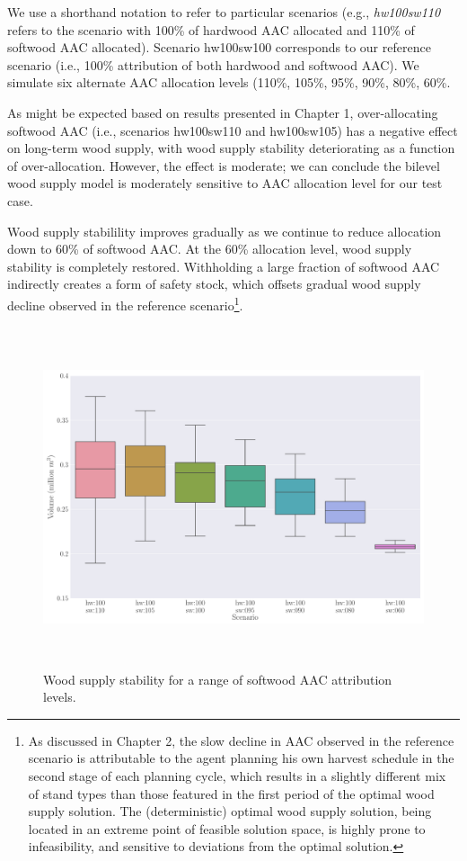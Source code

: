We use a shorthand notation to refer to particular scenarios (e.g., \emph{hw100sw110} refers to the scenario with 100\% of hardwood AAC allocated and 110\% of softwood AAC allocated).
Scenario hw100sw100 corresponds to our reference scenario (i.e., 100\% attribution of both hardwood and softwood AAC). 
We simulate six alternate AAC allocation levels (110\%, 105\%, 95\%, 90\%, 80\%, 60\%. 

As might be expected based on results presented in Chapter 1, over-allocating softwood AAC (i.e., scenarios hw100sw110 and hw100sw105) has a negative effect on long-term wood supply, with wood supply stability deteriorating as a function of over-allocation. However, the effect is moderate; we can conclude the bilevel wood supply model is moderately sensitive to AAC allocation level for our test case. 

Wood supply stabilility improves gradually as we continue to reduce allocation down to 60\% of softwood AAC. At the 60\% allocation level, wood supply stability is completely restored. Withholding a large fraction of softwood AAC indirectly creates a form of safety stock, which offsets gradual wood supply decline observed in the reference scenario\footnote{As discussed in Chapter 2, the slow decline in AAC observed in the reference scenario is attributable to the agent planning his own harvest schedule in the second stage of each planning cycle, which results in a slightly different mix of stand types than those featured in the first period of the optimal wood supply solution. The (deterministic) optimal wood supply solution, being located in an extreme point of feasible solution space, is highly prone to infeasibility, and sensitive to deviations from the optimal solution.}. 

\begin{figure}[H]
  \centering
  \includegraphics[height=10cm]{images/boxplots_series4}
  \caption{Wood supply stability for a range of softwood AAC attribution levels. }
  \label{fig:scenario_series_4}
\end{figure}

